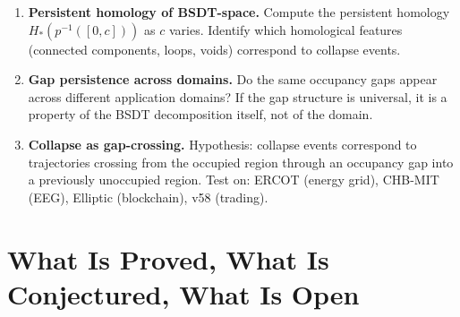 \documentclass[11pt,a4paper]{article}
\theoremstyle{definition}
\begin{document}
\begin{enumerate}
\item[\textbf{O1}] \textbf{Persistent homology of BSDT-space.}
  Compute the persistent homology $H_*(p^{-1}([0,c]))$ as $c$ varies.
  Identify which homological features (connected components, loops, voids)
  correspond to collapse events.

\item[\textbf{O2}] \textbf{Gap persistence across domains.}
  Do the same occupancy gaps appear across different application domains?
  If the gap structure is universal, it is a property of the BSDT decomposition
  itself, not of the domain.

\item[\textbf{O3}] \textbf{Collapse as gap-crossing.}
  Hypothesis: collapse events correspond to trajectories crossing from the
  occupied region through an occupancy gap into a previously unoccupied region.
  Test on: ERCOT (energy grid), CHB-MIT (EEG), Elliptic (blockchain), v58 (trading).
\end{enumerate}

\section{What Is Proved, What Is Conjectured, What Is Open}
\label{sec:status_prob}
\end{document}
